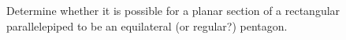 Determine whether it is possible for a planar section of a
rectangular parallelepiped to be an equilateral (or regular?) pentagon.
